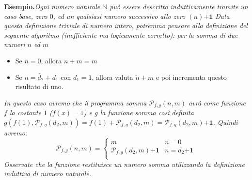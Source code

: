 \documentclass[]{scrartcl}
\newcommand{\prog}{\ensuremath{\mathcal{P}_{f,g}}}
\begin{document}
\textbf{Esempio.\quad }\textit{Ogni numero naturale $\mathbb{N}$ può essere descritto induttivamente tramite un caso base, zero $0$, ed un qualsiasi numero successivo allo zero $(n)\mathbf{+1}$ Data questa definizione triviale di numero intero, potremmo pensare alla definizione del seguente algoritmo (inefficiente ma logicamente corretto): per la somma di due numeri $n$ ed $m$}
\begin{itemize}
	\item Se $n=0$, allora $n+m=m$
	\item Se $n=\tilde{d_2}+d_1$ con $d_1=1$, allora valuta $\tilde{n}+m$ e poi incrementa questo risultato di uno.
\end{itemize}
\textit{In questo caso avremo che il programma somma $\prog(n,m)$ avrà come funzione $f$ la costante $1$ ($f(x)=1$) e $g$ la funzione somma così definita $g(f(1),\prog(d_2,m))=f(1)+\prog(d_2,m)=\prog(d_2,m)\mathbf{+1}$. Quindi avremo:}
\[\prog(n,m)=\begin{cases}
	m & n = 0\\
	\prog(d_2,m)\mathbf{+1} & n=d_2\mathbf{+1}\\
\end{cases}\]
\textit{Osservate che la funzione restituisce un numero somma utilizzando la definizione induttiva di numero naturale.}
\end{document}
